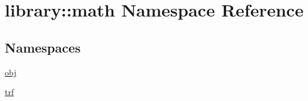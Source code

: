\hypertarget{namespacelibrary_1_1math}{}\section{library\+:\+:math Namespace Reference}
\label{namespacelibrary_1_1math}
\subsection*{Namespaces}
\begin{DoxyCompactItemize}
\item 
 \hyperlink{namespacelibrary_1_1math_1_1obj}{obj}
\item 
 \hyperlink{namespacelibrary_1_1math_1_1trf}{trf}
\end{DoxyCompactItemize}
